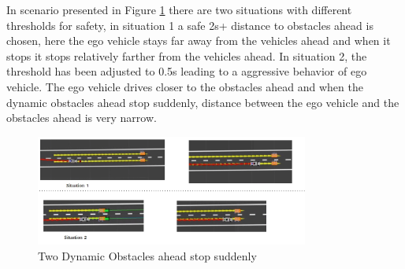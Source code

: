 In scenario presented in Figure \ref{dynamic_2} there are two situations with different thresholds for safety, in situation 1 a safe 2s+ distance to obstacles ahead is chosen, here the ego vehicle stays far away from the vehicles ahead and when it stops it stops relatively farther from the vehicles ahead. In situation 2, the threshold has been adjusted to 0.5s leading to a aggressive behavior of ego vehicle. The ego vehicle drives closer to the obstacles ahead and when the dynamic obstacles ahead stop suddenly, distance between the ego vehicle and the obstacles ahead is very narrow.   
\begin{figure}[h]
    \centering
    \includegraphics[width=0.8\textwidth]{Images/evaluation/dynamic_ahead_breaking2.jpg}
    \caption{Two Dynamic Obstacles ahead stop suddenly}
    \label{dynamic_2}
\end{figure}



